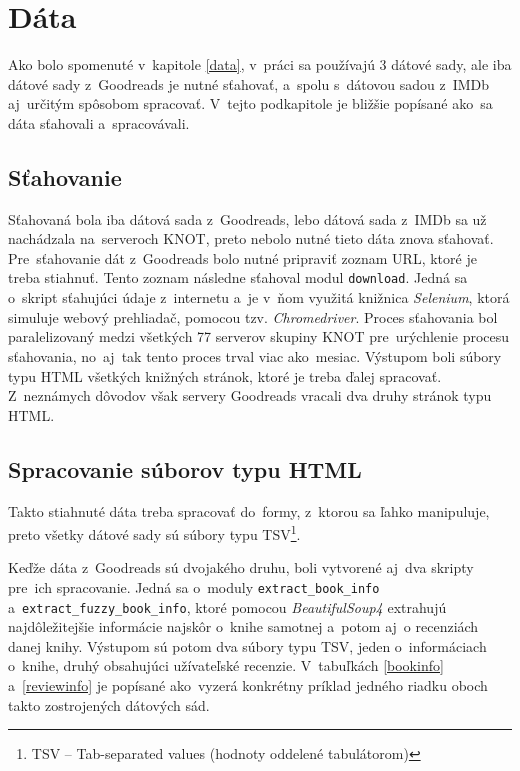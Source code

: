 \section{Dáta}

Ako bolo spomenuté v~kapitole \ref{data}, v~práci sa používajú 3 dátové sady, ale iba dátové sady z~Goodreads je nutné sťahovať, a~spolu s~dátovou sadou z~IMDb aj~určitým spôsobom spracovať. V~tejto podkapitole je bližšie popísané ako~sa dáta sťahovali a~spracovávali.

\subsection*{Sťahovanie}

Sťahovaná bola iba dátová sada z~Goodreads, lebo dátová sada z~IMDb sa už nachádzala na~serveroch KNOT, preto nebolo nutné tieto dáta znova sťahovať. Pre~sťahovanie dát z~Goodreads bolo nutné pripraviť zoznam URL, ktoré je treba stiahnuť. Tento zoznam následne sťahoval modul {\tt download}. Jedná sa o~skript sťahujúci údaje z~internetu a~je v~ňom využitá knižnica \textit{Selenium}, ktorá simuluje webový prehliadač, pomocou tzv. \textit{Chromedriver}. Proces sťahovania bol paralelizovaný medzi všetkých 77 serverov skupiny KNOT pre~urýchlenie procesu sťahovania, no~aj~tak tento proces trval viac ako~mesiac. Výstupom boli súbory typu HTML všetkých knižných stránok, ktoré je treba ďalej spracovať. Z~neznámych dôvodov však servery Goodreads vracali dva druhy stránok typu HTML.

\subsection*{Spracovanie súborov typu HTML}

Takto stiahnuté dáta treba spracovať do~formy, z~ktorou sa ľahko manipuluje, preto všetky dátové sady sú súbory typu TSV\footnote{TSV -- Tab-separated values (hodnoty oddelené tabulátorom)}.

Keďže dáta z~Goodreads sú dvojakého druhu, boli vytvorené aj~dva skripty pre~ich spracovanie. Jedná sa o~moduly {\tt extract\_book\_info} a~{\tt extract\_fuzzy\_book\_info}, ktoré pomocou \textit{BeautifulSoup4} extrahujú najdôležitejšie informácie najskôr o~knihe samotnej a~potom aj~o recenziách danej knihy. Výstupom sú potom dva súbory typu TSV, jeden o~informáciach o~knihe, druhý obsahujúci užívateľské recenzie. V~tabuľkách \ref{bookinfo} a~\ref{reviewinfo} je popísané ako~vyzerá konkrétny príklad jedného riadku oboch takto zostrojených dátových sád. 

